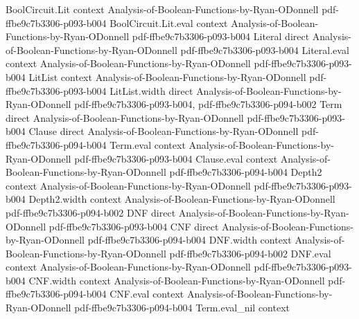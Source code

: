 \begin{theorem}
\leanok
{}
\proofstep
  {BoolCircuit.Lit}
  {context}
  {Analysis-of-Boolean-Functions-by-Ryan-ODonnell}
  {pdf-ffbe9c7b3306-p093-b004}
\proofstep
  {BoolCircuit.Lit.eval}
  {context}
  {Analysis-of-Boolean-Functions-by-Ryan-ODonnell}
  {pdf-ffbe9c7b3306-p093-b004}
\proofstep
  {Literal}
  {direct}
  {Analysis-of-Boolean-Functions-by-Ryan-ODonnell}
  {pdf-ffbe9c7b3306-p093-b004}
\proofstep
  {Literal.eval}
  {context}
  {Analysis-of-Boolean-Functions-by-Ryan-ODonnell}
  {pdf-ffbe9c7b3306-p093-b004}
\proofstep
  {LitList}
  {context}
  {Analysis-of-Boolean-Functions-by-Ryan-ODonnell}
  {pdf-ffbe9c7b3306-p093-b004}
\proofstep
  {LitList.width}
  {direct}
  {Analysis-of-Boolean-Functions-by-Ryan-ODonnell}
  {pdf-ffbe9c7b3306-p093-b004,
    pdf-ffbe9c7b3306-p094-b002}
\proofstep
  {Term}
  {direct}
  {Analysis-of-Boolean-Functions-by-Ryan-ODonnell}
  {pdf-ffbe9c7b3306-p093-b004}
\proofstep
  {Clause}
  {direct}
  {Analysis-of-Boolean-Functions-by-Ryan-ODonnell}
  {pdf-ffbe9c7b3306-p094-b004}
\proofstep
  {Term.eval}
  {context}
  {Analysis-of-Boolean-Functions-by-Ryan-ODonnell}
  {pdf-ffbe9c7b3306-p093-b004}
\proofstep
  {Clause.eval}
  {context}
  {Analysis-of-Boolean-Functions-by-Ryan-ODonnell}
  {pdf-ffbe9c7b3306-p094-b004}
\proofstep
  {Depth2}
  {context}
  {Analysis-of-Boolean-Functions-by-Ryan-ODonnell}
  {pdf-ffbe9c7b3306-p093-b004}
\proofstep
  {Depth2.width}
  {context}
  {Analysis-of-Boolean-Functions-by-Ryan-ODonnell}
  {pdf-ffbe9c7b3306-p094-b002}
\proofstep
  {DNF}
  {direct}
  {Analysis-of-Boolean-Functions-by-Ryan-ODonnell}
  {pdf-ffbe9c7b3306-p093-b004}
\proofstep
  {CNF}
  {direct}
  {Analysis-of-Boolean-Functions-by-Ryan-ODonnell}
  {pdf-ffbe9c7b3306-p094-b004}
\proofstep
  {DNF.width}
  {context}
  {Analysis-of-Boolean-Functions-by-Ryan-ODonnell}
  {pdf-ffbe9c7b3306-p094-b002}
\proofstep
  {DNF.eval}
  {context}
  {Analysis-of-Boolean-Functions-by-Ryan-ODonnell}
  {pdf-ffbe9c7b3306-p093-b004}
\proofstep
  {CNF.width}
  {context}
  {Analysis-of-Boolean-Functions-by-Ryan-ODonnell}
  {pdf-ffbe9c7b3306-p094-b004}
\proofstep
  {CNF.eval}
  {context}
  {Analysis-of-Boolean-Functions-by-Ryan-ODonnell}
  {pdf-ffbe9c7b3306-p094-b004}
\proofstep
  {Term.eval_nil}
  {context}

\end{theorem}

